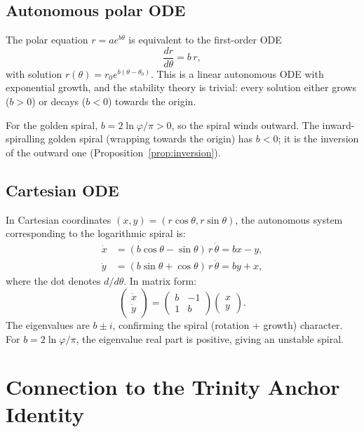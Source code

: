 \subsection{Autonomous polar ODE}
\label{subsec:17-ode-polar}

The polar equation \(r = ae^{b\theta}\) is equivalent to the
first-order ODE
\begin{equation}\label{eq:polar-ode}
  \frac{dr}{d\theta} = b\,r,
\end{equation}
with solution \(r(\theta) = r_0 e^{b(\theta-\theta_0)}\).
This is a linear autonomous ODE with exponential growth, and the
stability theory is trivial: every solution either grows
(\(b > 0\)) or decays (\(b < 0\)) towards the origin.

For the golden spiral, \(b = 2\ln\varphi/\pi > 0\), so the
spiral winds outward.  The inward-spiralling golden spiral
(wrapping towards the origin) has \(b < 0\); it is the inversion
of the outward one (Proposition~\ref{prop:inversion}).

\subsection{Cartesian ODE}
\label{subsec:17-ode-cartesian}

In Cartesian coordinates \((x,y) = (r\cos\theta, r\sin\theta)\),
the autonomous system corresponding to the logarithmic spiral is:
\begin{align}
  \dot x &= (b\cos\theta - \sin\theta)\,r\,\dot\theta
          = b x - y, \label{eq:cart-x}\\
  \dot y &= (b\sin\theta + \cos\theta)\,r\,\dot\theta
          = b y + x, \label{eq:cart-y}
\end{align}
where the dot denotes \(d/d\theta\).  In matrix form:
\[
  \begin{pmatrix}\dot x\\\dot y\end{pmatrix}
  = \begin{pmatrix} b & -1\\ 1 & b\end{pmatrix}
    \begin{pmatrix} x\\ y\end{pmatrix}.
\]
The eigenvalues are \(b \pm i\), confirming the spiral
(rotation + growth) character.  For \(b = 2\ln\varphi/\pi\),
the eigenvalue real part is positive, giving an unstable spiral.

\section{Connection to the Trinity Anchor Identity}
\label{sec:17-trinity}


